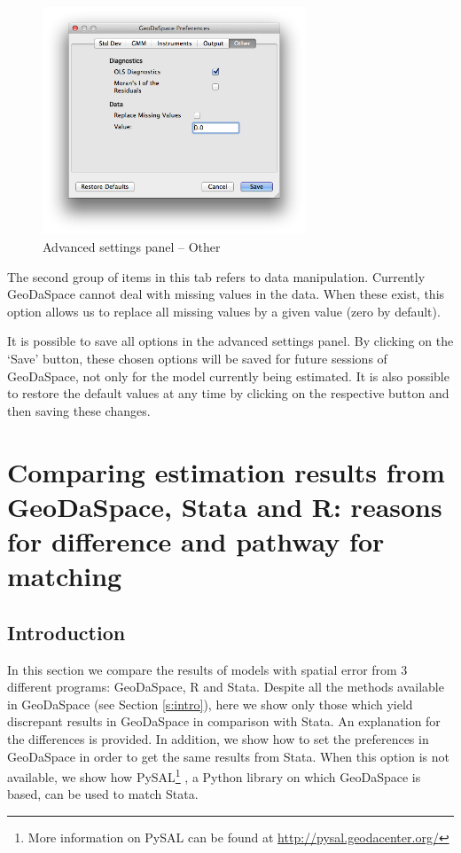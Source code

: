 \documentclass{article}
\begin{document}
\begin{figure}[htb]
\centering
\includegraphics[width=0.7\textwidth]{adv_other.png}
\caption{Advanced settings panel -- Other}
\label{f:adv_other}
\end{figure}

The second group of items in this tab refers to data manipulation. Currently GeoDaSpace cannot deal with missing values in the data. When these exist, this option allows us to replace all missing values by a given value (zero by default).

It is possible to save all options in the advanced settings panel. By clicking on the `Save' button, these chosen options will be saved for future sessions of GeoDaSpace, not only for the model currently being estimated. It is also possible to restore the default values at any time by clicking on the respective button and then saving these changes.

\newpage

\section{Comparing estimation results from GeoDaSpace, Stata and R: reasons for difference and pathway for matching}
\label{s:comparisons}

\subsection{Introduction}
In this section we compare the results of models with spatial error from 3 different programs: GeoDaSpace, R and Stata. Despite all the methods available in GeoDaSpace (see Section \ref{s:intro}), here we show only those which yield discrepant results in GeoDaSpace in comparison with Stata. An explanation for the differences is provided. In addition, we show how to set the preferences in GeoDaSpace in order to get the same results from Stata. When this option is not available, we show how PySAL\footnote{More information on PySAL can be found at \url{http://pysal.geodacenter.org/}} \citep{Rey07}, a Python library on which GeoDaSpace is based, can be used to match Stata.
\end{document}
